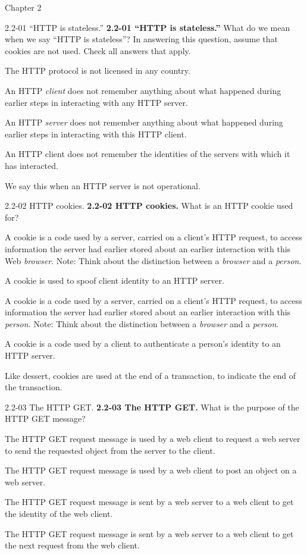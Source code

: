 \documentclass[11pt]{article}
\begin{document}
\begin{quiz}{Chapter 2}
\begin{multi}[points=1,shuffle,multiple]{2.2-01 ``HTTP is stateless.''}
\textbf{2.2-01 “HTTP is stateless.” } What do we mean when we say ``HTTP is stateless''? In answering this question, assume that cookies are not used. Check all answers that apply.
\item The HTTP protocol is not licensed in any country.
\item An HTTP \emph{client} does not remember anything about what happened during earlier steps in interacting with any HTTP server.
\item* An HTTP \emph{server} does not remember anything about what happened during earlier steps in interacting with this HTTP client.
\item An HTTP client does not remember the identities of the servers with which it has interacted.
\item We say this when an HTTP server is not operational.
\end{multi}

\begin{multi}[points=1,shuffle]{2.2-02 HTTP cookies.}
\textbf{2.2-02 HTTP cookies. } What is an HTTP cookie used for?
\item* A cookie is a code used by a server, carried on a client's HTTP request, to access information the server had earlier stored about an earlier interaction with this Web \emph{browser}. Note: Think about the distinction between a \emph{browser} and a \emph{person}.
\item A cookie is used to spoof client identity to an HTTP server.
\item A cookie is a code used by a server, carried on a client's HTTP request, to access information the server had earlier stored about an earlier interaction with this \emph{person.} Note: Think about the distinction between a \emph{browser} and a \emph{person}.
\item A cookie is a code used by a client to authenticate a person's identity to an HTTP server.
\item Like dessert, cookies are used at the end of a transaction, to indicate the end of the transaction.
\end{multi}

\begin{multi}[points=1,shuffle]{2.2-03 The HTTP GET.}
\textbf{2.2-03 The HTTP GET.}  What is the purpose of the HTTP GET message?
\item* The HTTP GET request message is used by a web client to request a web server to send the requested object from the server to the client.
\item The HTTP GET request message is used by a web client to post an object on a web server.
\item The HTTP GET request message is sent by a web server to a web client to get the identity of the web client.
\item The HTTP GET request message is sent by a web server to a web client to get the next request from the web client.
\end{multi}


\end{quiz}
\end{document}
